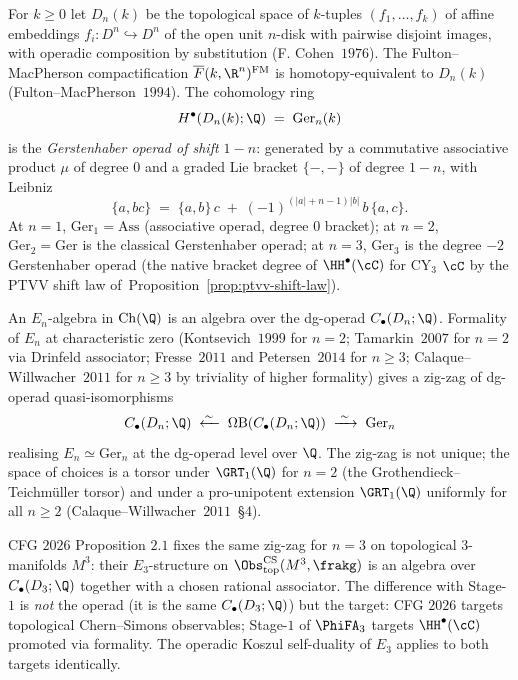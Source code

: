 \begin{definition}
\label{def:little-n-disks-ger-n-cfg2026}
\ClaimStatusDefinitional
For $k \geq 0$ let $D_n(k)$ be the topological space of $k$-tuples
$(f_1, \ldots, f_k)$ of affine embeddings
$f_i \colon D^n \hookrightarrow D^n$ of the open unit $n$-disk with
pairwise disjoint images, with operadic composition by substitution
(F. Cohen~$1976$). The Fulton--MacPherson compactification
$\overline{F}(k, \R^n)^{\mathrm{FM}}$ is homotopy-equivalent to $D_n(k)$
(Fulton--MacPherson~$1994$). The cohomology ring
\[
 H^\bullet(D_n(k); \Q) \;=\; \mathrm{Ger}_n(k)
\]
is the \emph{Gerstenhaber operad of shift $1 - n$}: generated by a
commutative associative product $\mu$ of degree $0$ and a graded Lie
bracket $\{-, -\}$ of degree $1 - n$, with Leibniz
\[
 \{a, bc\} \;=\; \{a, b\}\, c \;+\; (-1)^{(|a| + n - 1)|b|}\, b\, \{a, c\}.
\]
At $n = 1$, $\mathrm{Ger}_1 = \mathrm{Ass}$ (associative operad,
degree $0$ bracket); at $n = 2$, $\mathrm{Ger}_2 = \mathrm{Ger}$ is the
classical Gerstenhaber operad; at $n = 3$, $\mathrm{Ger}_3$ is the
degree $-2$ Gerstenhaber operad (the native bracket degree of
$\HH^\bullet(\cC)$ for CY$_3$ $\cC$ by the PTVV shift law
of~Proposition~\textup{\ref{prop:ptvv-shift-law}}).
\end{definition}

\begin{definition}
\label{def:e-n-algebra-chain-cfg2026}
\ClaimStatusDefinitional
An $E_n$-algebra in $\mathrm{Ch}(\Q)$ is an algebra over the dg-operad
$C_\bullet(D_n; \Q)$. Formality of $E_n$ at characteristic zero
(Kontsevich~$1999$ for $n = 2$; Tamarkin~$2007$ for $n = 2$ via
Drinfeld associator; Fresse~$2011$ and Petersen~$2014$ for $n \geq 3$;
Calaque--Willwacher~$2011$ for $n \geq 3$ by triviality of higher
formality) gives a zig-zag of dg-operad quasi-isomorphisms
\[
 C_\bullet(D_n; \Q) \;\xleftarrow{\sim\;}\; \Omega \mathrm{B}(C_\bullet(D_n; \Q)) \;\xrightarrow{\;\sim\;}\; \mathrm{Ger}_n
\]
realising $E_n \simeq \mathrm{Ger}_n$ at the dg-operad level over $\Q$.
The zig-zag is not unique; the space of choices is a torsor under
$\GRT_1(\Q)$ for $n = 2$ (the Grothendieck--Teichm\"uller torsor) and
under a pro-unipotent extension $\GRT_1(\Q)$ uniformly for all $n \geq 2$
(Calaque--Willwacher~$2011$~\S$4$).
\end{definition}

\begin{remark}
\label{rem:cfg-2026-e-n-torsor-cfg2026}
CFG $2026$ Proposition $2.1$ fixes the same zig-zag for $n = 3$ on
topological $3$-manifolds $M^3$: their $E_3$-structure on
$\Obs^{\mathrm{CS}}_{\mathrm{top}}(M^3, \frakg)$ is an algebra over
$C_\bullet(D_3; \Q)$ together with a chosen rational associator. The
difference with Stage-$1$ is \emph{not} the operad (it is the same
$C_\bullet(D_3; \Q)$) but the target: CFG $2026$ targets topological
Chern--Simons observables; Stage-$1$ of $\PhiFA_3$ targets
$\HH^\bullet(\cC)$ promoted via formality. The operadic Koszul
self-duality of $E_3$ applies to both targets identically.
\end{remark}

